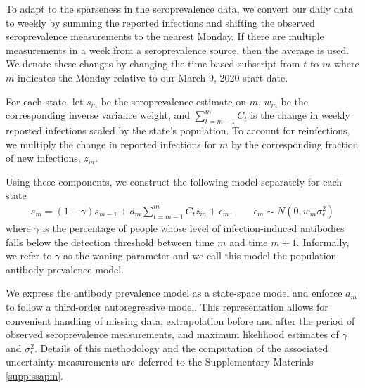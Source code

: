 \documentclass{article}
\begin{document}
To adapt to the sparseness in the seroprevalence data, we convert our daily data 
to weekly by summing the reported infections and shifting the observed 
seroprevalence measurements to the nearest Monday. If there are multiple 
measurements in a week from a seroprevalence source, then the average is used. 
We denote these changes by changing the time-based subscript 
from $t$ to $m$ where $m$ indicates the Monday 
relative to our March 9, 2020 start date.

For each state, let $s_m$ be the seroprevalence estimate on $m$, $w_m$ be the
corresponding inverse variance weight, and
 $\sum_{t = m-1}^{m} C_t$ is the change in weekly reported infections 
scaled by the state's population. 
To account for reinfections, we multiply the change in reported infections for $m$
by the corresponding fraction of new infections, $z_m$. 

Using these components, we construct the following model separately for each state
\begin{align}
s_m = (1 -\gamma)s_{m-1} + a_m \sum_{t = m - 1}^{m} C_t z_m + \epsilon_m, \qquad \epsilon_m \sim N(0, w_m \sigma^2_\epsilon) \label{eq:waningpr} 
\end{align}
where $\gamma$ is the percentage
of people whose level of infection-induced antibodies falls below the detection 
threshold between time $m$ and time $m+1$.
Informally, we refer to $\gamma$ as the waning parameter and we call this model the population 
antibody prevalence model. 

We express the antibody prevalence model as a state-space model and
enforce $a_m$ to follow a third-order autoregressive model. This representation
allows for convenient handling of missing data, extrapolation before and after
the period of observed seroprevalence measurements, and maximum likelihood
estimates of $\gamma$ and $\sigma^2_\epsilon$. Details of this methodology and
the computation of the associated uncertainty measurements are deferred to the
Supplementary Materials \ref{supp:ssapm}.
\end{document}
